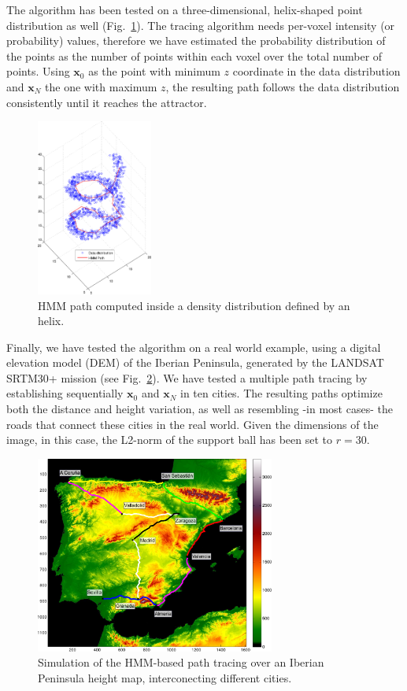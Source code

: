 The algorithm has been tested on a three-dimensional, helix-shaped point distribution as well (Fig.~\ref{fig:spire}). The tracing algorithm needs per-voxel intensity (or probability) values, therefore we have estimated the probability distribution of the points as the number of points within each voxel over the total number of points. Using $\mathbf{x}_0$ as the point with minimum $z$ coordinate in the data distribution and $\mathbf{x}_N$ the one with maximum $z$, the resulting path follows the data distribution consistently until it reaches the attractor. 
\begin{figure}
	\begin{center}
		\includegraphics[width=1.5in]{Graphics/ch6/spire}
		\caption{\ac{HMM} path computed inside a density distribution defined by an helix.}
		\label{fig:spire}
	\end{center}
\end{figure}

Finally, we have tested the algorithm on a real world example, using a digital elevation model (DEM) of the Iberian Peninsula, generated by the LANDSAT SRTM30+ mission (see Fig.~\ref{fig:spainmap}). We have tested a multiple path tracing by establishing sequentially $\mathbf{x}_0$ and $\mathbf{x}_N$ in ten cities. The resulting paths optimize both the distance and height variation, as well as resembling -in most cases- the roads that connect these cities in the real world. Given the dimensions of the image, in this case, the L2-norm of the support ball has been set to $r=30$. 

\begin{figure}[htp]
	\centering
	\includegraphics[width=0.7\textwidth]{Graphics/ch6/spain.pdf}
	\caption{Simulation of the \ac{HMM}-based path tracing over an Iberian Peninsula height map, interconecting different cities.}
	\label{fig:spainmap}
\end{figure}




